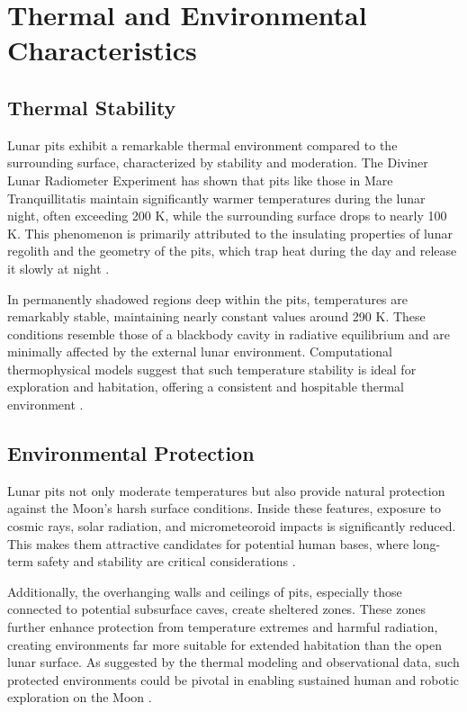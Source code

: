 \documentclass[12pt]{article}
\begin{document}
\section{Thermal and Environmental Characteristics}

\subsection{Thermal Stability}
Lunar pits exhibit a remarkable thermal environment compared to the surrounding surface, characterized by stability and moderation. The Diviner Lunar Radiometer Experiment has shown that pits like those in Mare Tranquillitatis maintain significantly warmer temperatures during the lunar night, often exceeding 200 K, while the surrounding surface drops to nearly 100 K. This phenomenon is primarily attributed to the insulating properties of lunar regolith and the geometry of the pits, which trap heat during the day and release it slowly at night \cite{thermal-lunar-pits}.

In permanently shadowed regions deep within the pits, temperatures are remarkably stable, maintaining nearly constant values around 290 K. These conditions resemble those of a blackbody cavity in radiative equilibrium and are minimally affected by the external lunar environment. Computational thermophysical models suggest that such temperature stability is ideal for exploration and habitation, offering a consistent and hospitable thermal environment \cite{thermal-lunar-pits}.

\subsection{Environmental Protection}
Lunar pits not only moderate temperatures but also provide natural protection against the Moon’s harsh surface conditions. Inside these features, exposure to cosmic rays, solar radiation, and micrometeoroid impacts is significantly reduced. This makes them attractive candidates for potential human bases, where long-term safety and stability are critical considerations \cite{thermal-lunar-pits}.

Additionally, the overhanging walls and ceilings of pits, especially those connected to potential subsurface caves, create sheltered zones. These zones further enhance protection from temperature extremes and harmful radiation, creating environments far more suitable for extended habitation than the open lunar surface. As suggested by the thermal modeling and observational data, such protected environments could be pivotal in enabling sustained human and robotic exploration on the Moon \cite{thermal-lunar-pits}.
\end{document}
